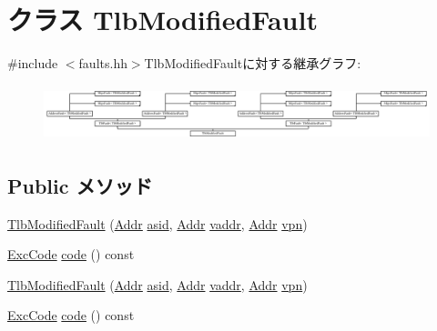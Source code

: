 \hypertarget{classMipsISA_1_1TlbModifiedFault}{
\section{クラス TlbModifiedFault}
\label{classMipsISA_1_1TlbModifiedFault}
}


{\ttfamily \#include $<$faults.hh$>$}TlbModifiedFaultに対する継承グラフ:\begin{figure}[H]
\begin{center}
\leavevmode
\includegraphics[height=1.64319cm]{classMipsISA_1_1TlbModifiedFault}
\end{center}
\end{figure}
\subsection*{Public メソッド}
\begin{DoxyCompactItemize}
\item 
\hyperlink{classMipsISA_1_1TlbModifiedFault_ab261557a8ae48a09a85999d0ddccfead}{TlbModifiedFault} (\hyperlink{classm5_1_1params_1_1Addr}{Addr} \hyperlink{classMipsISA_1_1TlbFault_a3bd75b410169a5c0e356fda4d021e49c}{asid}, \hyperlink{classm5_1_1params_1_1Addr}{Addr} \hyperlink{classMipsISA_1_1AddressFault_a9f933b300ef63eea367ca82f8da31025}{vaddr}, \hyperlink{classm5_1_1params_1_1Addr}{Addr} \hyperlink{classMipsISA_1_1TlbFault_ad378f7d20675898b2a5994600528fa9a}{vpn})
\item 
\hyperlink{namespaceMipsISA_abcc8a7c57cd8becefbfd621dbff5ffd4}{ExcCode} \hyperlink{classMipsISA_1_1TlbModifiedFault_a1dd20a2460d7723d3eaa287b7cc07e79}{code} () const 
\item 
\hyperlink{classMipsISA_1_1TlbModifiedFault_ab261557a8ae48a09a85999d0ddccfead}{TlbModifiedFault} (\hyperlink{classm5_1_1params_1_1Addr}{Addr} \hyperlink{classMipsISA_1_1TlbFault_a3bd75b410169a5c0e356fda4d021e49c}{asid}, \hyperlink{classm5_1_1params_1_1Addr}{Addr} \hyperlink{classMipsISA_1_1AddressFault_a9f933b300ef63eea367ca82f8da31025}{vaddr}, \hyperlink{classm5_1_1params_1_1Addr}{Addr} \hyperlink{classMipsISA_1_1TlbFault_ad378f7d20675898b2a5994600528fa9a}{vpn})
\item 
\hyperlink{namespaceMipsISA_abcc8a7c57cd8becefbfd621dbff5ffd4}{ExcCode} \hyperlink{classMipsISA_1_1TlbModifiedFault_a1dd20a2460d7723d3eaa287b7cc07e79}{code} () const 
\end{DoxyCompactItemize}


